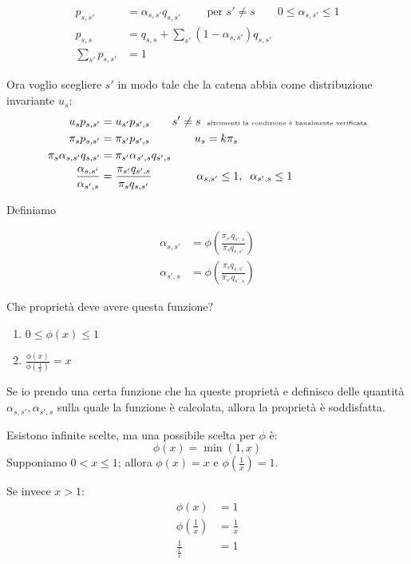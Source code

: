 \documentclass[a4paper,12pt]{book}
\newcommand\ddfrac[2]{\frac{\displaystyle #1}{\displaystyle #2}}
\begin{document}
\begin{align*}
	 p_{s,s'} & = \alpha_{s,s'}q_{s,s'} \qquad \text{ per } s' \ne s \qquad 0 \le \alpha_{s,s'} \le 1 \\
	 p_{s,s} & = q_{s,s} + \sum_{s'}(1 - \alpha_{s,s'})q_{s,s'} \\
	 \sum_{s'}p_{s,s'} & = 1
\end{align*}

Ora voglio scegliere $ s' $ in modo tale che la catena abbia come distribuzione invariante $ u_s $:
\begin{align*}
	u_s p_{s,s'} & = u_{s'}p_{s',s} \qquad s' \ne s \; \; \text{\tiny altrimenti la condizione è banalmente verificata} \\
	\pi_s p_{s,s'} & = \pi_{s'}p_{s',s} \qquad \qquad u_s = k\pi_s \\
	\pi_s \alpha_{s,s'}q_{s,s'} & = \pi_{s'}\alpha_{s',s}q_{s',s} \\		
	\ddfrac{\alpha_{s,s'}}{\alpha_{s',s}} & = \ddfrac{\pi_{s'}q_{s',s}}{\pi_s q_{s,s'}} \qquad \qquad \alpha_{s,s'} \le 1 , \; \;  \alpha_{s',s} \le 1
\end{align*}

Definiamo

\begin{align*}
	\alpha_{s,s'} & = \phi \left(\ddfrac{\pi_{s'} q_{s',s}}{\pi_s q_{s,s'}}\right) \\
	\alpha_{s',s} & = \phi \left(\ddfrac{\pi_{s} q_{s,s'}}{\pi_{s'} q_{s',s}}\right) 
\end{align*}

Che proprietà deve avere questa funzione?

\begin{enumerate}
	\item $ 0 \le \phi(x) \le 1 $
	\item $ \ddfrac{\phi(x)}{\phi\left(\frac{1}{x}\right)} = x $
\end{enumerate}

Se io prendo una certa funzione che ha queste proprietà e definisco delle quantità $ \alpha_{s,s'}, \alpha_{s',s} $ sulla quale la funzione è calcolata, allora la proprietà è soddisfatta. %

Esistono infinite scelte, ma una possibile scelta per $\phi$ è:
$$ \phi(x) = \min(1,x) $$
Supponiamo $ 0 < x \le 1 $; allora $ \phi(x) = x $ e $ \phi(\frac{1}{x}) = 1 $.

Se invece $ x > 1 $: 
\begin{align*}
	\phi(x) & = 1 \\
	\phi(\frac{1}{x}) & = \frac{1}{x} \\
	\frac{1}{\frac{1}{x}} & = 1
\end{align*}
\end{document}
